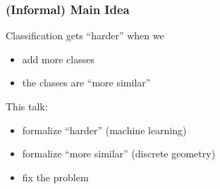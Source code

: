 \begin{frame}
\frametitle{(Informal) Main Idea}


Classification gets ``harder'' when we
\begin{itemize}
\item add more classes
\item the classes are ``more similar''
\end{itemize}

\vspace{0.2in}
This talk:
\begin{itemize}
\item formalize ``harder'' (machine learning)
\item formalize ``more similar'' (discrete geometry)
\item fix the problem
\end{itemize}

\end{frame}
